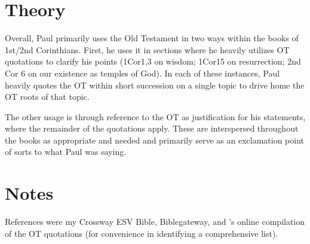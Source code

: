 \documentclass[12pt]{turabian-researchpaper}
\begin{document}
\section{Theory}

Overall, Paul primarily uses the Old Testament in two ways within the books of 1st/2nd Corinthians. First, he uses it in sections where he heavily utilizes OT quotations to clarify his points (1Cor1,3 on wisdom; 1Cor15 on resurrection; 2nd Cor 6 on our existence as temples of God). In each of these instances, Paul heavily quotes the OT within short succession on a single topic to drive home the OT roots of that topic.

The other usage is through reference to the OT as justification for his statements, where the remainder of the quotations apply. These are interspersed throughout the books as appropriate and needed and primarily serve as an exclamation point of sorts to what Paul was saying.

\section{Notes}

References were my Crossway ESV Bible, Biblegateway, and \citeauthor{rudd17}'s online compilation of the OT quotations (for convenience in identifying a comprehensive list).

\newpage


\printbibliography
\end{document}
